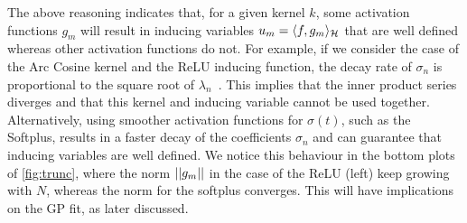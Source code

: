 
The above reasoning indicates that, for a given kernel $k$, some activation functions $g_m$ will result in inducing variables $u_m = \langle f, g_m \rangle_{{\mathcal{H}}}$ that are well defined whereas other activation functions do not. For example, if we consider the case of the Arc Cosine kernel and the ReLU inducing function, the decay rate of $\sigma_n$ is proportional to the square root of $\lambda_n$~\citep{bach2017breaking,bietti2020deep}. This implies that the inner product series diverges and that this kernel and inducing variable cannot be used together. Alternatively, using smoother activation functions for $\sigma(t)$, such as the Softplus, results in a faster decay of the coefficients $\sigma_n$ and can guarantee that inducing variables are well defined. We notice this behaviour in the bottom plots of \cref{fig:trunc}, where the norm $\lvert\lvert g_m\rvert\rvert$ in the case of the ReLU (left) keep growing with $N$, whereas the norm for the softplus converges. This will have implications on the GP fit, as later discussed.

